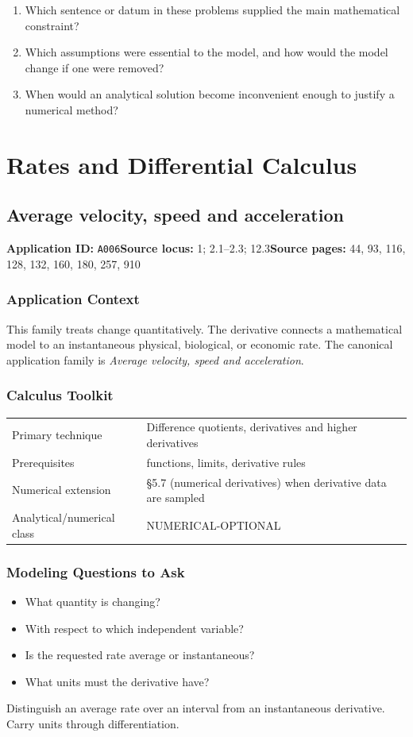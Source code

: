\documentclass[11pt]{book}
\newcommand{\pid}[1]{\texttt{#1}}
\begin{document}
\begin{reflectionbox}\begin{enumerate}
\item Which sentence or datum in these problems supplied the main mathematical constraint?
\item Which assumptions were essential to the model, and how would the model change if one were removed?
\item When would an analytical solution become inconvenient enough to justify a numerical method?
\end{enumerate}\end{reflectionbox}
\part{Rates and Differential Calculus}
\chapter{Average velocity, speed and acceleration}\label{app:A006}
\textbf{Application ID:} \pid{A006}\quad \textbf{Source locus:} 1; 2.1–2.3; 12.3\quad \textbf{Source pages:} 44, 93, 116, 128, 132, 160, 180, 257, 910
\section*{Application Context}
This family treats change quantitatively. The derivative connects a mathematical model to an instantaneous physical, biological, or economic rate. The canonical application family is \emph{Average velocity, speed and acceleration}.
\section*{Calculus Toolkit}
\begin{tabularx}{\textwidth}{@{}lX@{}}\toprule
Primary technique & Difference quotients, derivatives and higher derivatives \\
Prerequisites & functions, limits, derivative rules \\
Numerical extension & §5.7 (numerical derivatives) when derivative data are sampled \\
Analytical/numerical class & NUMERICAL-OPTIONAL \\
\bottomrule\end{tabularx}
\section*{Modeling Questions to Ask}\begin{itemize}
\item What quantity is changing?
\item With respect to which independent variable?
\item Is the requested rate average or instantaneous?
\item What units must the derivative have?
\end{itemize}
\begin{errorbox}Distinguish an average rate over an interval from an instantaneous derivative. Carry units through differentiation.\end{errorbox}
\end{document}
